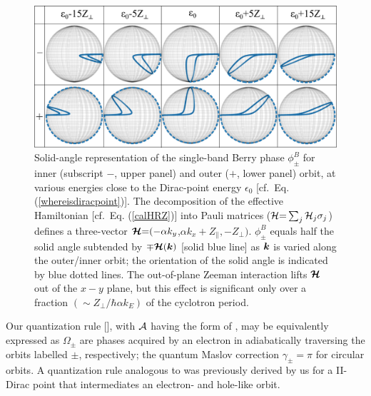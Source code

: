 \documentclass[aps, showpacs, twocolumn, notitlepage, superscriptaddress]{revtex4-1}
\begin{document}
\begin{figure}
\includegraphics[width=1.0\columnwidth]{blochsphere.png}
\caption{Solid-angle representation of  the single-band Berry phase $\phi_{\pm}^B$ for inner (subscript $-$, upper panel) and outer ($+$, lower panel) orbit, at various energies close to the Dirac-point energy $\epsilon_0$ [cf.\ Eq. (\ref{whereisdiracpoint})]. The decomposition of the effective Hamiltonian [cf.\ Eq. (\ref{calHRZ})] into  Pauli matrices (${\cal H}{=}\sum_j{\cal H}_j\sigma_j$) defines a three-vector $\boldsymbol{{\cal H}}{=}({-}\alpha k_y$,$\alpha k_x{+}Z_\parallel,{-}Z_\perp)$. $\phi_{\pm}^B$ equals half the solid angle subtended by   ${\mp} \boldsymbol{{\cal H}}(\boldsymbol{k})$ [solid blue line] as $\boldsymbol{k}$ is varied along the outer/inner orbit\cite{berry_quantal_1984}; the orientation of the solid angle is indicated by blue dotted lines. The out-of-plane Zeeman interaction lifts $\boldsymbol{{\cal H}}$ out of the $x-y$ plane, but this effect is significant only over a fraction $(\sim Z_{\perp}/\hbar \alpha k_E)$  of the cyclotron period. %
\label{fig:blochsphere}}
\end{figure}

Our quantization rule [], with ${\cal A}$ having the form of , may be equivalently expressed as
$\Omega_{\pm}$ are phases acquired by an electron in adiabatically traversing the orbits labelled $\pm$, respectively; the quantum Maslov correction $\gamma_{\pm}{=}\pi$ for circular orbits.  A quantization rule analogous to  was previously derived by us for a II-Dirac point that intermediates an electron- and hole-like orbit\cite{AALG}. 
\end{document}
